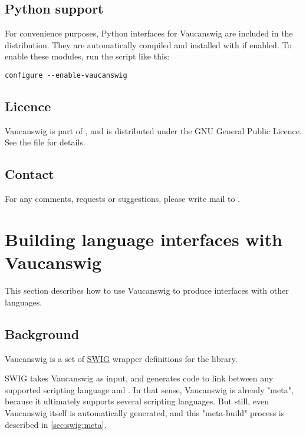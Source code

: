 \subsection{Python support}

For convenience purposes, Python interfaces for Vaucanswig are
included in the distribution.  They are automatically compiled and
installed with \Vauc if enabled.  To enable these modules, run the
 script like this:

\begin{lstlisting}
configure --enable-vaucanswig  
\end{lstlisting}

\subsection{Licence}

Vaucanswig  is part  of \Vauc,  and is  distributed under  the GNU
General Public Licence. See the file  for details.

\subsection{Contact}

For  any  comments, requests  or  suggestions,  please  write mail  to
.


\section{Building language interfaces with Vaucanswig}
\label{sec:swig:build}

This section describes how to use Vaucanswig to produce interfaces
with other languages.

\subsection{Background}

Vaucanswig is a set of \href{http://www.swig.org}{SWIG} wrapper
definitions for the \Vauc library.

SWIG takes Vaucanswig as input, and generates code to link between any
supported scripting language and \Cxx. In that sense, Vaucanswig is
already "meta", because it ultimately supports several scripting
languages. But still, even Vaucanswig itself is automatically
generated, and this "meta-build" process is described in
\autoref{sec:swig:meta}.

